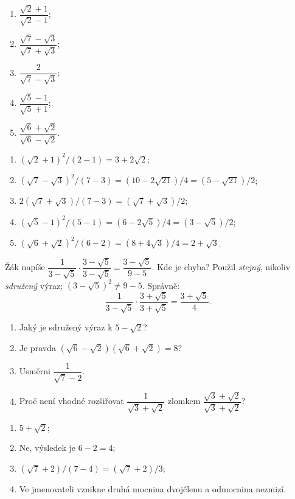 \documentclass[11pt,a4paper]{article}
\begin{document}
\begin{zadaniReseniBox}[breakable=false,title={Samostatná práce 2: promysli nejprve strategii}]
\begin{enumerate}[label=\alph*)]
\item $\dfrac{\sqrt2+1}{\sqrt2-1}$;
\item $\dfrac{\sqrt7-\sqrt3}{\sqrt7+\sqrt3}$;
\item $\dfrac2{\sqrt7-\sqrt3}$;
\item $\dfrac{\sqrt5-1}{\sqrt5+1}$;
\item $\dfrac{\sqrt6+\sqrt2}{\sqrt6-\sqrt2}$.
\end{enumerate}
\tcblower
\begin{enumerate}[label=\alph*)]
\item $(\sqrt2+1)^2/(2-1)=3+2\sqrt2$;
\item $(\sqrt7-\sqrt3)^2/(7-3)=(10-2\sqrt{21})/4=(5-\sqrt{21})/2$;
\item $2(\sqrt7+\sqrt3)/(7-3)=(\sqrt7+\sqrt3)/2$;
\item $(\sqrt5-1)^2/(5-1)=(6-2\sqrt5)/4=(3-\sqrt5)/2$;
\item $(\sqrt6+\sqrt2)^2/(6-2)=(8+4\sqrt3)/4=2+\sqrt3$.
\end{enumerate}
\end{zadaniReseniBox}

\begin{prikladReseniBox}[breakable=false,title={Příklad 3: najdi a oprav chybu}]
Žák napíše $\dfrac1{3-\sqrt5}\cdot\dfrac{3-\sqrt5}{3-\sqrt5}
=\dfrac{3-\sqrt5}{9-5}$. Kde je chyba?
\tcblower
Použil \emph{stejný}, nikoliv \emph{sdružený} výraz;
$(3-\sqrt5)^2\ne9-5$.
Správně:
\[
\frac1{3-\sqrt5}\cdot\frac{3+\sqrt5}{3+\sqrt5}
=\boxed{\frac{3+\sqrt5}{4}}.
\]
\end{prikladReseniBox}

\begin{zadaniReseniBox}[breakable=false,title={Samostatná práce 3: tři otázky ke kontrole}]
\begin{enumerate}[label=\alph*)]
\item Jaký je sdružený výraz k $5-\sqrt2$?
\item Je pravda $(\sqrt6-\sqrt2)(\sqrt6+\sqrt2)=8$?
\item Usměrni $\dfrac{1}{\sqrt7-2}$.
\item Proč není vhodné rozšiřovat $\dfrac1{\sqrt3+\sqrt2}$ zlomkem
$\dfrac{\sqrt3+\sqrt2}{\sqrt3+\sqrt2}$?
\end{enumerate}
\tcblower
\begin{enumerate}[label=\alph*)]
\item $5+\sqrt2$;
\item Ne, výsledek je $6-2=4$;
\item $(\sqrt7+2)/(7-4)=(\sqrt7+2)/3$;
\item Ve jmenovateli vznikne druhá mocnina dvojčlenu a odmocnina nezmizí.
\end{enumerate}
\end{zadaniReseniBox}
\end{document}

